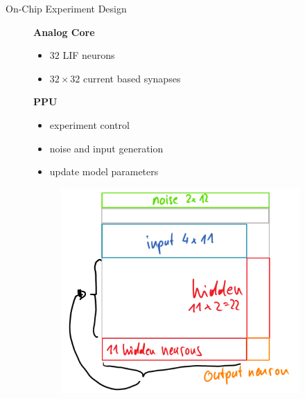 \documentclass[12pt, aspectratio=169]{beamer}
\begin{document}
\begin{frame}{On-Chip Experiment Design}
    \begin{figure}[!htb]
    	    \textbf{Analog Core}
            \begin{itemize}
                \item $32$ LIF neurons
                \item $32 \times 32$ current based synapses
            \end{itemize}
        \textbf{PPU}
            \begin{itemize}
                \item experiment control
                \item noise and input generation
                \item update model parameters
            \end{itemize}
        
      	\endminipage\hfill
      	\centering
      	
            \scalebox{.9}{}
        
            \begin{figure}
                \includegraphics[scale=0.22]{synapse_array_transparent.png}
                \label{membrane_potential}
            \end{figure}
        \endminipage\hfill
    \end{figure}
\end{frame}
\end{document}
